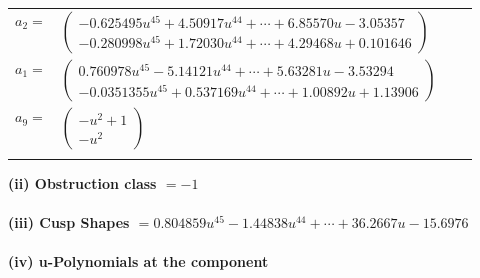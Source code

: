 \documentclass[1p]{elsarticle_modified}
\theoremstyle{definition}
\begin{document}
\begin{tabular}{m{7pt} m{180pt} m{7pt} m{180pt} }
\flushright $a_{2}=$&$\begin{pmatrix}-0.625495 u^{45}+4.50917 u^{44}+\cdots+6.85570 u-3.05357\\-0.280998 u^{45}+1.72030 u^{44}+\cdots+4.29468 u+0.101646\end{pmatrix}$ \\
\flushright $a_{1}=$&$\begin{pmatrix}0.760978 u^{45}-5.14121 u^{44}+\cdots+5.63281 u-3.53294\\-0.0351355 u^{45}+0.537169 u^{44}+\cdots+1.00892 u+1.13906\end{pmatrix}$ \\
\flushright $a_{9}=$&$\begin{pmatrix}- u^2+1\\- u^2\end{pmatrix}$\\&\end{tabular}
\flushleft \textbf{(ii) Obstruction class $= -1$}\\~\\
\flushleft \textbf{(iii) Cusp Shapes $= 0.804859 u^{45}-1.44838 u^{44}+\cdots+36.2667 u-15.6976$}\\~\\
\newpage\renewcommand{\arraystretch}{1}
\flushleft \textbf{(iv) u-Polynomials at the component}\newline \\
\end{document}
